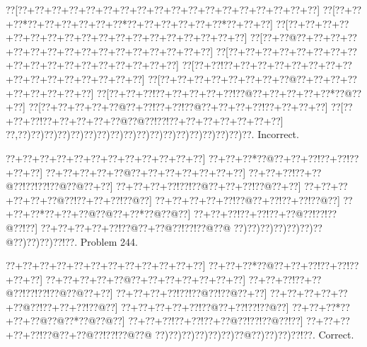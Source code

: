 \documentclass[a5paper]{article}
\begin{document}
\begin{center}
{\goo
\0??[\0??+\0??+\0??+\0??+\0??+\0??+\0??+\0??+\0??+\0??+\0??+\0??+\0??+\0??+\0??+\0??+\0??+\0??]
\0??[\0??+\0??+\0??*\0??+\0??+\0??+\0??+\0??+\0??*\0??+\0??+\0??+\0??+\0??+\0??*\0??+\0??+\0??]
\0??[\0??+\0??+\0??+\0??+\0??+\0??+\0??+\0??+\0??+\0??+\0??+\0??+\0??+\0??+\0??+\0??+\0??+\0??]
\0??[\0??+\0??@\0??+\0??+\0??+\0??+\0??+\0??+\0??+\0??+\0??+\0??+\0??+\0??+\0??+\0??+\0??+\0??]
\0??[\0??+\0??+\0??+\0??+\0??+\0??+\0??+\0??+\0??+\0??+\0??+\0??+\0??+\0??+\0??+\0??+\0??+\0??]
\0??[\0??+\0??!\0??+\0??+\0??+\0??+\0??+\0??+\0??+\0??+\0??+\0??+\0??+\0??+\0??+\0??+\0??+\0??]
\0??[\0??+\0??+\0??+\0??+\0??+\0??+\0??+\0??@\0??+\0??+\0??+\0??+\0??+\0??+\0??+\0??+\0??]
\0??[\0??+\0??+\0??!\0??+\0??+\0??+\0??+\0??!\0??@\0??+\0??+\0??+\0??+\0??*\0??@\0??+\0??]
\0??[\0??+\0??+\0??+\0??+\0??@\0??+\0??!\0??+\0??!\0??@\0??+\0??+\0??+\0??!\0??+\0??+\0??+\0??]
\0??[\0??+\0??+\0??!\0??+\0??+\0??+\0??+\0??@\0??@\0??!\0??!\0??+\0??+\0??+\0??+\0??+\0??+\0??]
\0??,\0??)\0??)\0??)\0??)\0??)\0??)\0??)\0??)\0??)\0??)\0??)\0??)\0??)\0??)\0??)\0??)\0??)\0??.
}
Incorrect. 

\end{center}
\newpage
\begin{center}
{\goo
\0??+\0??+\0??+\0??+\0??+\0??+\0??+\0??+\0??+\0??+\0??+\0??]
\0??+\0??+\0??*\0??@\0??+\0??+\0??!\0??+\0??!\0??+\0??+\0??]
\0??+\0??+\0??+\0??+\0??@\0??+\0??+\0??+\0??+\0??+\0??+\0??]
\0??+\0??+\0??!\0??+\0??@\0??!\0??!\0??!\0??@\0??@\0??+\0??]
\0??+\0??+\0??+\0??!\0??!\0??@\0??+\0??+\0??!\0??@\0??+\0??]
\0??+\0??+\0??+\0??+\0??+\0??@\0??!\0??+\0??+\0??!\0??@\0??]
\0??+\0??+\0??+\0??+\0??!\0??@\0??+\0??!\0??+\0??!\0??@\0??]
\0??+\0??+\0??*\0??+\0??+\0??@\0??@\0??+\0??*\0??@\0??@\0??]
\0??+\0??+\0??!\0??+\0??!\0??+\0??@\0??!\0??!\0??@\0??!\0??]
\0??+\0??+\0??+\0??+\0??!\0??@\0??+\0??@\0??!\0??!\0??@\0??@
\0??)\0??)\0??)\0??)\0??)\0??)\0??@\0??)\0??)\0??)\0??!\0??.
}
Problem 244.

\end{center}
\begin{center}
{\goo
\0??+\0??+\0??+\0??+\0??+\0??+\0??+\0??+\0??+\0??+\0??+\0??]
\0??+\0??+\0??*\0??@\0??+\0??+\0??!\0??+\0??!\0??+\0??+\0??]
\0??+\0??+\0??+\0??+\0??@\0??+\0??+\0??+\0??+\0??+\0??+\0??]
\0??+\0??+\0??!\0??+\0??@\0??!\0??!\0??!\0??@\0??@\0??+\0??]
\0??+\0??+\0??+\0??!\0??!\0??@\0??!\0??@\0??+\0??]
\0??+\0??+\0??+\0??+\0??+\0??@\0??!\0??+\0??+\0??!\0??@\0??]
\0??+\0??+\0??+\0??+\0??!\0??@\0??+\0??!\0??!\0??@\0??]
\0??+\0??+\0??*\0??+\0??+\0??@\0??@\0??*\0??@\0??@\0??]
\0??+\0??+\0??!\0??+\0??!\0??+\0??@\0??!\0??!\0??@\0??!\0??]
\0??+\0??+\0??+\0??+\0??!\0??@\0??+\0??@\0??!\0??!\0??@\0??@
\0??)\0??)\0??)\0??)\0??)\0??)\0??@\0??)\0??)\0??)\0??!\0??.
}
Correct. 

\end{center}
\end{document}
